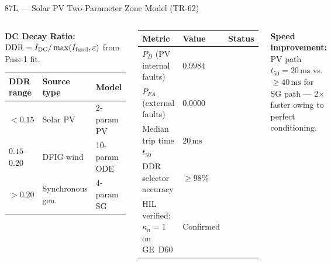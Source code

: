 \documentclass[aspectratio=169, 10pt]{beamer}
\newcommand{\ms}{\,\text{ms}}
\newcommand{\kn}{\kappa_n}
\newcommand{\cmark}{\textcolor{thesisgreen}{\ding{51}}}
\newcommand{\PD}{P_D}
\newcommand{\PFA}{P_{FA}}
\begin{document}
\begin{frame}{87L — Solar PV Two-Parameter Zone Model (TR-62)}
\begin{columns}[t]
\begin{tcolorbox}[resultbox, title={DDR Model Selector}]
\footnotesize
\textbf{DC Decay Ratio:} $\text{DDR} = I_{\rm DC}/\max(I_{\rm fund}, \varepsilon)$
from Pass-1 fit.\\[4pt]
\begin{tabular}{@{}lll@{}}
  \toprule
  \textbf{DDR range} & \textbf{Source type} & \textbf{Model}\\
  \midrule
  $< 0.15$           & Solar PV            & 2-param PV\\
  $0.15$–$0.20$      & DFIG wind           & 10-param ODE\\
  $> 0.20$           & Synchronous gen.    & 4-param SG\\
  \bottomrule
\end{tabular}
\end{tcolorbox}
\vspace{5pt}
\begin{tcolorbox}[resultbox, title={TR-62 Monte Carlo — 5\,000 Trials}]
\footnotesize
\begin{tabular}{@{}lll@{}}
  \toprule
  \textbf{Metric} & \textbf{Value} & \textbf{Status}\\
  \midrule
  $\PD$ (PV internal faults) & $0.9984$ & \cmark \\
  $\PFA$ (external faults)   & $0.0000$ & \cmark \\
  Median trip time $t_{50}$  & $20\ms$  & \cmark \\
  DDR selector accuracy      & $\geq 98\%$ & \cmark \\
  HIL verified: $\kn=1$ on GE~D60 & Confirmed & \cmark \\
  \bottomrule
\end{tabular}
\end{tcolorbox}
\vspace{4pt}
\begin{tcolorbox}[keybox]
\footnotesize
\textbf{Speed improvement:} PV path $t_{50}=20\ms$
vs.\ $\geq 40\ms$ for SG path — 2$\times$ faster owing to
perfect conditioning.
\end{tcolorbox}
\end{columns}
\end{frame}
\end{document}
